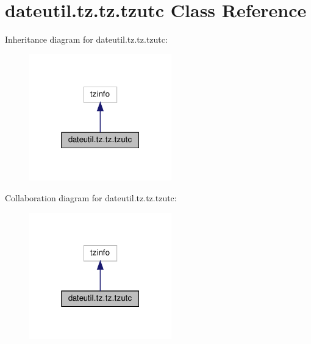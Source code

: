 \hypertarget{classdateutil_1_1tz_1_1tz_1_1tzutc}{}\section{dateutil.\+tz.\+tz.\+tzutc Class Reference}
\label{classdateutil_1_1tz_1_1tz_1_1tzutc}


Inheritance diagram for dateutil.\+tz.\+tz.\+tzutc\+:
\nopagebreak
\begin{figure}[H]
\begin{center}
\leavevmode
\includegraphics[width=175pt]{classdateutil_1_1tz_1_1tz_1_1tzutc__inherit__graph}
\end{center}
\end{figure}


Collaboration diagram for dateutil.\+tz.\+tz.\+tzutc\+:
\nopagebreak
\begin{figure}[H]
\begin{center}
\leavevmode
\includegraphics[width=175pt]{classdateutil_1_1tz_1_1tz_1_1tzutc__coll__graph}
\end{center}
\end{figure}
